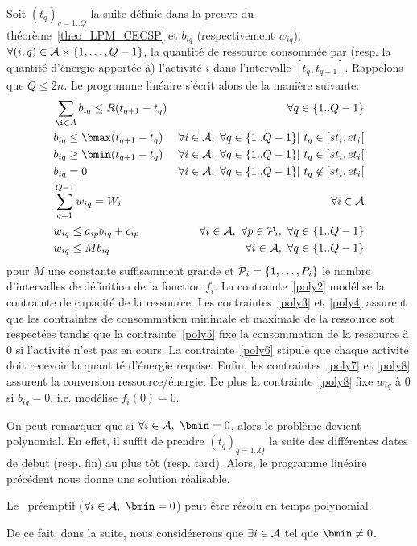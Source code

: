 Soit $(t_q)_{q=1..Q}$ la suite définie dans la preuve du
théorème~\ref{theo_LPM_CECSP} et $b_{iq}$ (respectivement $w_{iq}$),
$\forall (i,q) \in \A\times\{1,\dots,Q-1\}$, la
quantité de ressource consommée par (resp. la quantité d'énergie
apportée à) l'activité $i$ dans l'intervalle
$[t_q,t_{q+1}]$. Rappelons que $Q \le 2n$. Le programme linéaire
s'écrit alors de la manière suivante:
{\small
\begin{align}
&\sum_{\i \in A} b_{iq} \le R(t_{q+1}-t_q)  & \forall q\in
\{1..Q-1\} \label{poly2}\\
& b_{iq} \le \bmax(t_{q+1}-t_q)  & \forall i \in \A,\ \forall q \in \{1..Q-1\} |\
t_q \in [st_i,et_i[\label{poly3}\\
& b_{iq} \ge \bmin (t_{q+1}-t_q) & \forall i \in \A,\ \forall q \in \{1..Q-1\} |\ t_q
\in [st_i,et_i[\label{poly4}\\
 & b_{iq}=0 & \forall i \in \A,\ \forall q \in \{1..Q-1\} |\ t_q
\not\in [st_i,et_i[\label{poly5}\\ 
& \sum_{q=1}^{Q-1} w_{iq} = W_i & \forall i \in
\A\label{poly6}\\
 & w_{iq} \le a_{ip}b_{iq} + c_{ip} & \forall i \in \A,\ \forall p \in
\P_i,\ \forall q \in \{1..Q-1\}\label{poly7}\\ 
& w_{iq} \le Mb_{iq} & \forall i \in \A,\ \forall q \in
\{1..Q-1\}\label{poly8}
\end{align} }
pour $M$ une constante suffisamment grande et $\P_i=\{1,\dots,P_i\}$
le nombre d'intervalles de définition de la fonction $f_i$. La
contrainte~\eqref{poly2} modélise la contrainte de capacité de la
ressource. Les contraintes~\eqref{poly3} et~\eqref{poly4} assurent que
les contraintes de consommation minimale et maximale de la ressource
sot respectées tandis que la contrainte~\eqref{poly5} fixe la
consommation de la ressource à $0$ si l'activité n'est pas en
cours. La contrainte~\eqref{poly6} stipule que chaque activité doit
recevoir la quantité d'énergie requise. Enfin, les
contraintes~\eqref{poly7} et \eqref{poly8} assurent la conversion
ressource/énergie. De plus la contrainte~\eqref{poly8} fixe $w_{iq}$ à
$0$ si $b_{iq}=0$, i.e. modélise $f_i(0)=0$.

On peut remarquer que si $\forall i \in \A,\ \bmin=0$, alors le
problème devient polynomial. En effet, il suffit de prendre 
$(t_q)_{q=1..Q}$ la suite des différentes dates de début (resp. fin)
au plus tôt (resp. tard). Alors, le programme linéaire précédent nous
donne une solution réalisable. 

\begin{theo}
Le \CECSP~préemptif ($\forall i \in \A,\ \bmin=0$) peut être résolu en
temps polynomial.
\end{theo}

De ce fait, dans la suite, nous considérerons que $\exists i \in \A$
tel que $\bmin\neq 0$.
